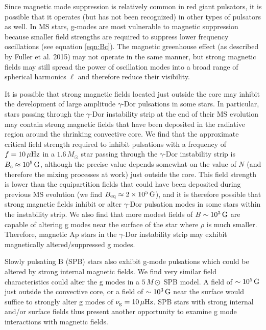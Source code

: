 Since magnetic mode suppression is relatively common in red giant pulsators, it is possible that it operates (but has not been recognized) in other types of pulsators as well. In MS stars, g-modes are most vulnerable to magnetic suppression because smaller field strengths are required to suppress lower frequency oscillations (see equation \ref{eqn:Bc}). The magnetic greenhouse effect (as described by Fuller et al. 2015) may not operate in the same manner, but strong magnetic fields may still spread the power of oscillation modes into a broad range of spherical harmonics $\ell$ and therefore reduce their visibility. 

It is possible that strong magnetic fields located just outside the core may inhibit the development of large amplitude $\gamma$-Dor pulsations in some stars. In particular, stars passing through the $\gamma$-Dor instability strip at the end of their MS evolution may contain strong magnetic fields that have been deposited in the radiative region around the shrinking convective core. We find that the approximate critical field strength required to inhibit pulsations with a frequency of $f = 10 \, \mu {\rm Hz}$ in a $1.6 \, M_\odot$ star passing through the $\gamma$-Dor instability strip is $B_c \approx 10^5 \, {\rm G}$, although the precise value depends somewhat on the value of $N$ (and therefore the mixing processes at work) just outside the core. This field strength is lower than the equipartition fields that could have been deposited during previous MS evolution (we find $B_{\rm eq} \approx 2 \times 10^5 \, {\rm G}$), and it is therefore possible that strong magnetic fields inhibit or alter $\gamma$-Dor pulsation modes in some stars within the instability strip. We also find that more modest fields of $B \sim 10^{3} \, {\rm G}$ are capable of altering g modes near the surface of the star where $\rho$ is much smaller. Therefore, magnetic Ap stars in the $\gamma$-Dor instability strip may exhibit magnetically altered/suppressed g modes. 

Slowly pulsating B (SPB) stars also exhibit g-mode pulsations which could be altered by strong internal magnetic fields. We find very similar field characteristics could alter the g modes in a $5 \, M\odot$ SPB model. A field of $\sim 10^5 \, {\rm G}$ just outside the convective core, or a field of $\sim 10^{3} \, {\rm G}$ near the surface would suffice to strongly alter g modes of $\nu_{\rm g} = 10 \, \mu {\rm Hz}$. SPB stars with strong internal and/or surface fields thus present another opportunity to examine g mode interactions with magnetic fields.


  
  
  
  
  
  
  
  
  
  
  
  
  
  
  
  
  
  
  
  
  
  
  
  
  
  